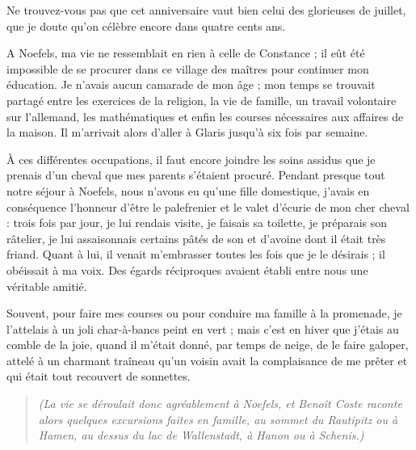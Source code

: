 \documentclass[11pt,a4paper]{report}
\begin{document}
Ne trouvez-vous pas que cet anniversaire vaut bien celui des glorieuses de juillet, que je doute qu'on célèbre encore dans quatre cents ans.

\vspace{0.3cm}\hrulefill\vspace{0.3cm}

A Noefels, ma vie ne ressemblait en rien à celle de Constance ; il eût été impossible de se procurer dans ce village des maîtres pour continuer mon éducation. Je n'avais aucun camarade de mon âge ; mon temps se trouvait partagé entre les exercices de la religion, la vie de famille, un travail volontaire sur l'allemand, les mathématiques et enfin les courses nécessaires aux affaires de la maison. Il m'arrivait alors d'aller à Glaris jusqu'à six fois par semaine.

À ces différentes occupations, il faut encore joindre les soins assidus que je prenais d'un cheval que mes parents s'étaient procuré. Pendant presque tout notre séjour à Noefels, nous n'avons eu qu'une fille domestique, j'avais en conséquence l'honneur d'être le palefrenier et le valet d'écurie de mon cher cheval : trois fois par jour, je lui rendais visite, je faisais sa toilette, je préparais son râtelier, je lui assaisonnais certains pâtés de son et d'avoine dont il était très friand. Quant à lui, il venait m'embrasser toutes les fois que je le désirais ; il obéissait à ma voix. Des égards réciproques avaient établi entre nous une véritable amitié.

Souvent, pour faire mes courses ou pour conduire ma famille à la promenade, je l'attelais à un joli char-à-bancs peint en vert ; mais c'est en hiver que j'étais au comble de la joie, quand il m'était donné, par temps de neige, de le faire galoper, attelé à un charmant traîneau qu'un voisin avait la complaisance de me prêter et qui était tout recouvert de sonnettes.

\begin{quote}
\textit{(La vie se déroulait donc agréablement à Noefels, et Benoît Coste raconte alors quelques excursions faites en famille, au sommet du Rautipitz ou à Hamen, au dessus du lac de Wallenstadt, à Hanon ou à Schenis.)}
\end{quote}
\end{document}
